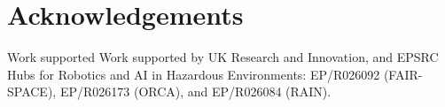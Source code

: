 
  
\section*{Acknowledgements}   

Work supported Work supported by UK Research and Innovation, and EPSRC Hubs for Robotics and AI in Hazardous Environments: EP/R026092 (FAIR-SPACE), EP/R026173 (ORCA), and EP/R026084 (RAIN).

